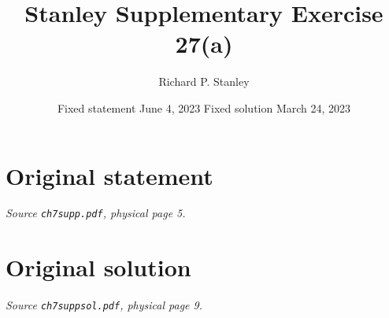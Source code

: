 \documentclass[11pt,a4paper]{article}
\title{Stanley Supplementary Exercise 27(a)}
\author{Richard P. Stanley}
\date{Fixed statement June 4, 2023 \qquad Fixed solution March 24, 2023}
\begin{document}
\maketitle
\section*{Original statement}
\noindent\emph{Source \texttt{ch7supp.pdf}, physical page 5.}\par\medskip

\clearpage
\section*{Original solution}
\noindent\emph{Source \texttt{ch7suppsol.pdf}, physical page 9.}\par\medskip

\end{document}
